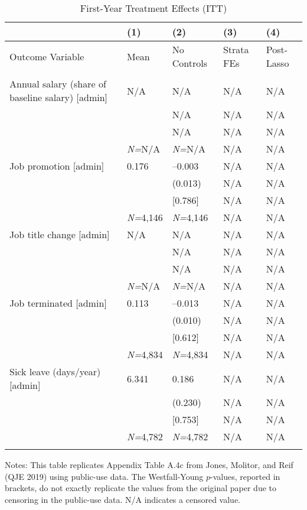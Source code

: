 \documentclass{article}
\begin{document}
\setlength{\tabcolsep}{6pt}
\begin{table}[tbp] \centering
{}

\caption{First-Year Treatment Effects (ITT)}
\label{tab:appendix_itt_job_vars_admin_0816_0717}
{\scriptsize
\begin{tabularx}{\linewidth}{lCCCC}

\toprule
&{(1)}&{(2)}&{(3)}&{(4)} \tabularnewline \midrule
{Outcome Variable}&{Mean}&{No Controls}&{Strata FEs}&{Post-Lasso} \tabularnewline
\midrule 
\addlinespace[1.4ex]
 \tabularnewline
\midrule Annual salary (share of baseline salary) [admin]&N/A&N/A&N/A&N/A \tabularnewline
&&N/A&N/A&N/A \tabularnewline
&&N/A&N/A&N/A \tabularnewline
&\textit{N=}N/A&\textit{N=}N/A&N/A&N/A \tabularnewline
\addlinespace[1.4ex]
Job promotion [admin]&0.176&--0.003&N/A&N/A \tabularnewline
&&(0.013)&N/A&N/A \tabularnewline
&&[0.786]&N/A&N/A \tabularnewline
&\textit{N=}4,146&\textit{N=}4,146&N/A&N/A \tabularnewline
\addlinespace[1.4ex]
Job title change [admin]&N/A&N/A&N/A&N/A \tabularnewline
&&N/A&N/A&N/A \tabularnewline
&&N/A&N/A&N/A \tabularnewline
&\textit{N=}N/A&\textit{N=}N/A&N/A&N/A \tabularnewline
\addlinespace[1.4ex]
Job terminated [admin]&0.113&--0.013&N/A&N/A \tabularnewline
&&(0.010)&N/A&N/A \tabularnewline
&&[0.612]&N/A&N/A \tabularnewline
&\textit{N=}4,834&\textit{N=}4,834&N/A&N/A \tabularnewline
\addlinespace[1.4ex]
Sick leave (days/year) [admin]&6.341&0.186&N/A&N/A \tabularnewline
&&(0.230)&N/A&N/A \tabularnewline
&&[0.753]&N/A&N/A \tabularnewline
&\textit{N=}4,782&\textit{N=}4,782&N/A&N/A \tabularnewline
\bottomrule\addlinespace[-1.5ex] 

\end{tabularx}
\begin{flushleft}
\footnotesize Notes: This table replicates Appendix Table A.4c from Jones, Molitor, and Reif (QJE 2019) using public-use data. The Westfall-Young \(p\)-values, reported in brackets, do not exactly replicate the values from the original paper due to censoring in the public-use data. N/A indicates a censored value.
\end{flushleft}
}
\end{table}
\end{document}
